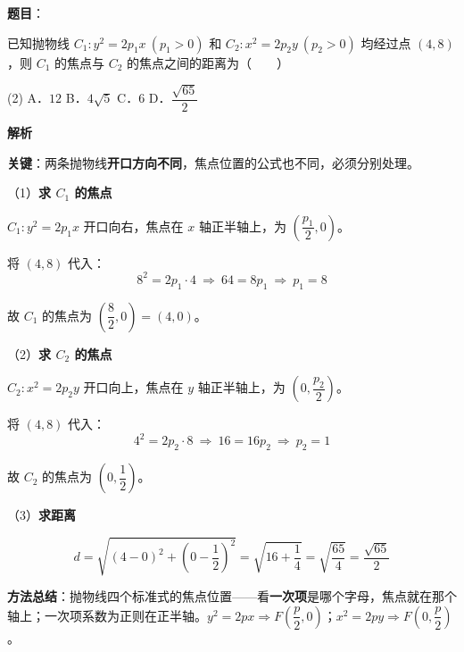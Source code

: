 \begin{answer}

\textbf{题目}：

已知抛物线 $C_1:y^2=2p_1x\ (p_1>0)$ 和 $C_2:x^2=2p_2y\ (p_2>0)$ 均经过点 $(4,8)$，则 $C_1$ 的焦点与 $C_2$ 的焦点之间的距离为\mbox{（　　）}

\begin{gkopts}(2)
\task A．$12$
\task B．$4\sqrt{5}$
\task C．$6$
\task D．$\dfrac{\sqrt{65}}{2}$
\end{gkopts}

\textbf{解析}

\textbf{关键}：两条抛物线\textbf{开口方向不同}，焦点位置的公式也不同，必须分别处理。

（1）\textbf{求 $C_1$ 的焦点}

$C_1:y^2=2p_1x$ 开口向右，焦点在 $x$ 轴正半轴上，为 $\left(\dfrac{p_1}{2},0\right)$。

将 $(4,8)$ 代入：
\nopagebreak[4]
\[8^2=2p_1\cdot 4\ \Longrightarrow\ 64=8p_1\ \Longrightarrow\ p_1=8\]

故 $C_1$ 的焦点为 $\left(\dfrac82,0\right)=(4,0)$。

（2）\textbf{求 $C_2$ 的焦点}

$C_2:x^2=2p_2y$ 开口向上，焦点在 $y$ 轴正半轴上，为 $\left(0,\dfrac{p_2}{2}\right)$。

将 $(4,8)$ 代入：
\nopagebreak[4]
\[4^2=2p_2\cdot 8\ \Longrightarrow\ 16=16p_2\ \Longrightarrow\ p_2=1\]

故 $C_2$ 的焦点为 $\left(0,\dfrac12\right)$。

（3）\textbf{求距离}

\nopagebreak[4]
\[d=\sqrt{(4-0)^2+\left(0-\frac12\right)^2}=\sqrt{16+\frac14}=\sqrt{\frac{65}{4}}=\frac{\sqrt{65}}{2}\]

\begin{gktip}
\textbf{方法总结}：抛物线四个标准式的焦点位置——看\textbf{一次项}是哪个字母，焦点就在那个轴上；一次项系数为正则在正半轴。$y^2=2px\Rightarrow F\left(\dfrac p2,0\right)$；$x^2=2py\Rightarrow F\left(0,\dfrac p2\right)$。
\end{gktip}


\par\medskip

\end{answer}
